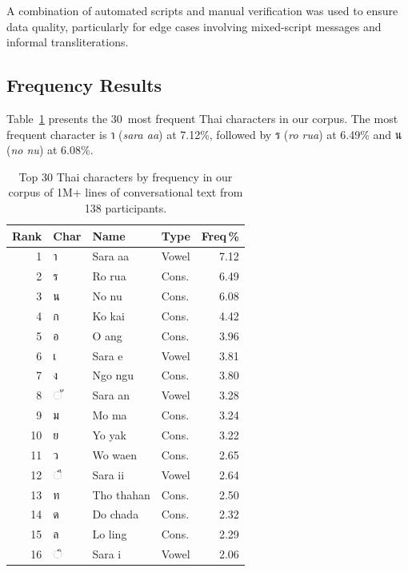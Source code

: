\documentclass[10pt,twocolumn,a4paper]{article}
\newcommand{\thai}[1]{{\thaifont #1}}
\begin{document}
A combination of automated scripts and manual verification was used to ensure data quality, particularly for edge cases involving mixed-script messages and informal transliterations.

\subsection{Frequency Results}
\label{sec:data_results}

Table~\ref{tab:freq} presents the 30~most frequent Thai characters in our corpus.
The most frequent character is \thai{า} (\emph{sara aa}) at 7.12\%, followed by \thai{ร} (\emph{ro rua}) at 6.49\% and \thai{น} (\emph{no nu}) at 6.08\%.

\begin{table}[t]
\centering
\caption{Top 30 Thai characters by frequency in our corpus of 1M+ lines of conversational text from 138 participants.}
\label{tab:freq}
\small
\begin{tabular}{@{}rlllr@{}}
\toprule
\textbf{Rank} & \textbf{Char} & \textbf{Name} & \textbf{Type} & \textbf{Freq\,\%} \\
\midrule
 1 & \thai{า}  & Sara aa       & Vowel & 7.12 \\
 2 & \thai{ร}  & Ro rua        & Cons. & 6.49 \\
 3 & \thai{น}  & No nu         & Cons. & 6.08 \\
 4 & \thai{ก}  & Ko kai        & Cons. & 4.42 \\
 5 & \thai{อ}  & O ang         & Cons. & 3.96 \\
 6 & \thai{เ}  & Sara e        & Vowel & 3.81 \\
 7 & \thai{ง}  & Ngo ngu       & Cons. & 3.80 \\
 8 & \thai{◌ั} & Sara an       & Vowel & 3.28 \\
 9 & \thai{ม}  & Mo ma         & Cons. & 3.24 \\
10 & \thai{ย}  & Yo yak        & Cons. & 3.22 \\
11 & \thai{ว}  & Wo waen       & Cons. & 2.65 \\
12 & \thai{◌ี} & Sara ii       & Vowel & 2.64 \\
13 & \thai{ท}  & Tho thahan    & Cons. & 2.50 \\
14 & \thai{ด}  & Do chada      & Cons. & 2.32 \\
15 & \thai{ล}  & Lo ling       & Cons. & 2.29 \\
16 & \thai{◌ิ} & Sara i        & Vowel & 2.06 \\

\end{tabular}
\end{table}
\end{document}
